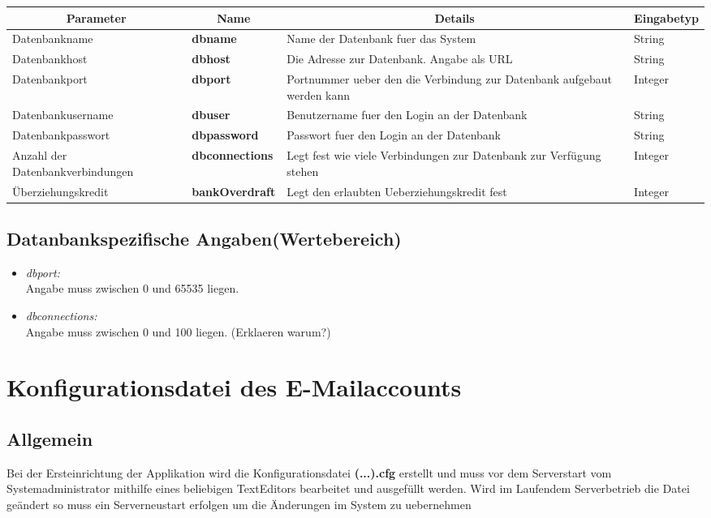 \begin{center}
	\begin{longtable}{|p{4cm} | p{3cm}| p{7cm} | p{2cm} |}
		\hline
		\multicolumn{1}{|c|}{\textbf{Parameter}} & \multicolumn{1}{c|}{\textbf{Name}} & \multicolumn{1}{c|}{\textbf{Details}} & \multicolumn{1}{c|}{\textbf{Eingabetyp}}
		 \\ \hline
		Datenbankname & \textbf{dbname} & Name der Datenbank fuer das System & String \\ \hline
		Datenbankhost & \textbf{dbhost} & Die Adresse zur Datenbank. Angabe als URL & String \\ \hline
		Datenbankport & \textbf{dbport} & Portnummer ueber den die Verbindung zur Datenbank aufgebaut werden kann & Integer \\ \hline
		Datenbankusername & \textbf{dbuser} & Benutzername fuer den Login an der Datenbank & String  \\ \hline
		Datenbankpasswort & \textbf{dbpassword} & Passwort fuer den Login an der Datenbank & String \\ \hline
		Anzahl der Datenbankverbindungen & \textbf{dbconnections} & Legt fest wie viele Verbindungen zur Datenbank zur Verfügung stehen & Integer \\ \hline
		Überziehungskredit & \textbf{bankOverdraft} & Legt den erlaubten Ueberziehungskredit fest & Integer \\ \hline
	\end{longtable}
	

\end{center}
\subsection{Datanbankspezifische Angaben(Wertebereich)}

\begin{itemize}
	\item \emph{dbport:}\\
		Angabe muss zwischen 0 und 65535 liegen.
	\item \emph{dbconnections:}\\
		Angabe muss zwischen 0 und 100 liegen. (Erklaeren warum?)
\end{itemize}

\section{Konfigurationsdatei des E-Mailaccounts}
\subsection{Allgemein}
Bei der Ersteinrichtung der Applikation wird die Konfigurationsdatei \textbf{(...).cfg} erstellt und muss vor dem Serverstart vom Systemadministrator mithilfe eines beliebigen TextEditors bearbeitet und ausgefüllt werden. Wird im Laufendem Serverbetrieb die Datei geändert so muss ein Serverneustart erfolgen um die Änderungen im System zu uebernehmen

